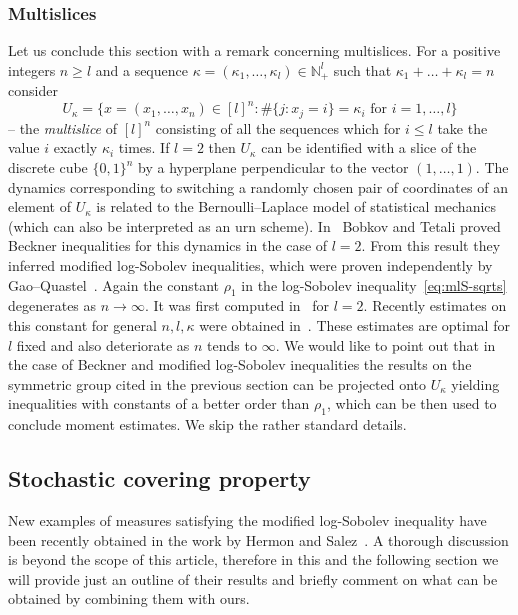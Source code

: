 \documentclass[a4paper]{amsart}
\theoremstyle{definition}
\theoremstyle{remark}
\numberwithin{equation}{section}
\newcommand*{\NN}{\mathbb{N}}
\begin{document}
\subsubsection{Multislices}\label{sec:multiscales}
Let us conclude this section with a remark concerning multislices. For  a positive integers $n \ge l$ and a sequence $\kappa = (\kappa_1,\ldots,\kappa_l) \in \NN_+^l$ such that $\kappa_1+\ldots+\kappa_l = n$ consider
\[
U_\kappa = \{x=(x_1,\ldots,x_n) \in [l]^n \colon \#\{j : x_j = i\} = \kappa_i \text{ for }  i = 1,\ldots,l\}
\]
 -- the \emph{multislice} of $[l]^n$ consisting of all the sequences which for $i \le l$ take the value $i$ exactly $\kappa_i$ times. If $l=2$ then $U_\kappa$ can be identified with a slice of the discrete cube $\{0,1\}^n$ by a hyperplane perpendicular to the vector $(1,\ldots,1)$. The dynamics corresponding to switching a randomly chosen pair of coordinates of an element of $U_\kappa$ is related to the Bernoulli--Laplace model of statistical mechanics (which can also be interpreted as an urn scheme). In~\cite{MR2283379} Bobkov and Tetali proved Beckner inequalities for this dynamics in the case of $l = 2$. From this result they inferred modified log-Sobolev inequalities, which were proven independently by Gao--Quastel~\cite{MR2023890}. Again the constant $\rho_1$ in the log-Sobolev inequality~\eqref{eq:mlS-sqrts} degenerates as $n \to \infty$. 
It was first computed in~\cite{MR1675008} for $l = 2$. 
Recently estimates on this constant for general $n,l,\kappa$ were obtained in~\cite{filmus2018logsobolev}. 
These estimates are optimal for $l$ fixed and also deteriorate as $n$ tends to $\infty$. 
We would like to point out that in the case of Beckner and modified log-Sobolev inequalities the results on the symmetric group cited in the previous section can be projected onto $U_\kappa$ yielding inequalities with constants of a better order than $\rho_1$, which can be then used to conclude moment estimates. 
We skip the rather standard details.
 

\subsection{Stochastic covering property}
New examples of measures satisfying the modified log-Sobolev inequality have been recently obtained in the work by Hermon and Salez~\cite{hermon2019entropy,hermon2019modified}. A thorough discussion is beyond the scope of this article, therefore in this and the following section we will provide just an outline of their results and briefly comment on what can be obtained by combining them with ours.
\end{document}
